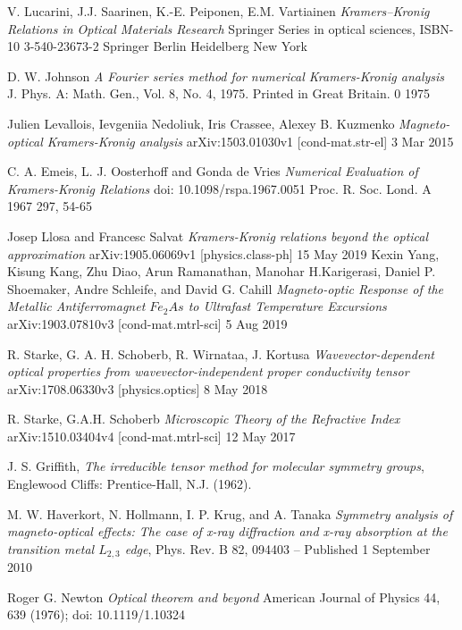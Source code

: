 \documentclass[twocolumn,amsmath,superscriptaddress,amssymb]{revtex4-1}
\begin{document}
\begin{thebibliography}
V. Lucarini, J.J. Saarinen, K.-E. Peiponen, E.M. Vartiainen
\textit{Kramers–Kronig Relations in Optical Materials Research}
Springer Series in optical sciences, ISBN-10 3-540-23673-2 Springer Berlin Heidelberg New York

D. W. Johnson
\textit{A Fourier series method for numerical Kramers-Kronig analysis}
J. Phys. A: Math. Gen., Vol. 8, No. 4, 1975. Printed in Great Britain. 0 1975 
 
Julien Levallois, Ievgeniia Nedoliuk, Iris Crassee, Alexey B. Kuzmenko
\textit{Magneto-optical Kramers-Kronig analysis}
arXiv:1503.01030v1 [cond-mat.str-el] 3 Mar 2015

C. A. Emeis, L. J. Oosterhoff and Gonda de Vries
\textit{Numerical Evaluation of Kramers-Kronig Relations}
doi: 10.1098/rspa.1967.0051
Proc. R. Soc. Lond. A 1967 297, 54-65

Josep Llosa and Francesc Salvat
\textit{Kramers-Kronig relations beyond the optical approximation}
arXiv:1905.06069v1 [physics.class-ph] 15 May 2019
Kexin Yang, Kisung Kang, Zhu Diao, Arun Ramanathan, Manohar H.Karigerasi, Daniel P. Shoemaker, Andre Schleife, and David G. Cahill
\textit{Magneto-optic Response of the Metallic Antiferromagnet $Fe_2As$ to Ultrafast Temperature Excursions}
arXiv:1903.07810v3 [cond-mat.mtrl-sci] 5 Aug 2019

R. Starke, G. A. H. Schoberb, R. Wirnataa, J. Kortusa
\textit{Wavevector-dependent optical properties from wavevector-independent proper conductivity tensor}
arXiv:1708.06330v3 [physics.optics] 8 May 2018

R. Starke, G.A.H. Schoberb
\textit{Microscopic Theory of the Refractive Index}
arXiv:1510.03404v4 [cond-mat.mtrl-sci] 12 May 2017

J. S. Griffith,
\textit{The irreducible tensor method for molecular symmetry groups},
Englewood Cliffs: Prentice-Hall, N.J. (1962).

M. W. Haverkort, N. Hollmann, I. P. Krug, and A. Tanaka
\textit{Symmetry analysis of magneto-optical effects: The case of x-ray diffraction and x-ray absorption at the transition metal 
$L_{2,3}$ edge},
Phys. Rev. B 82, 094403 – Published 1 September 2010

Roger G. Newton
\textit{Optical theorem and beyond}
American Journal of Physics 44, 639 (1976); doi: 10.1119/1.10324

\end{thebibliography}
\end{document}
